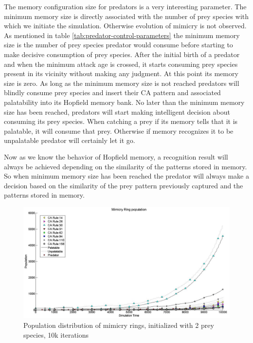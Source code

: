 The memory configuration size for predators is a very interesting parameter. The minimum memory size is directly associated with the number of prey species with which we initiate the simulation. Otherwise evolution of mimicry is not observed. As mentioned in table \ref{tab:predator-control-parameters} the minimum memory size is the number of prey species predator would consume before starting to make decisive consumption of prey species. After the initial birth of a predator and when the minimum attack age is crossed, it starts consuming prey species present in its vicinity without making any judgment. At this point its memory size is zero. As long as the minimum memory size is not reached predators will blindly consume prey species and insert their CA pattern and associated palatability into its Hopfield memory bank. No later than the minimum memory size has been reached, predators will start making intelligent decision about consuming its prey species. When catching a prey if its memory tells that it is palatable, it will consume that prey. Otherwise if memory recognizes it to be unpalatable predator will certainly let it go.

Now as we know the behavior of Hopfield memory, a recognition result will always be achieved depending on the similarity of the patterns stored in memory. So when minimum memory size has been reached the predator will always make a decision based on the similarity of the prey pattern previously captured and the patterns stored in memory.

\begin{figure}[H]
	\centering
	\includegraphics[scale=0.40]{images/simTime10k-2Prey}
	\caption[Population distribution of mimicry rings (2 prey species, 10k iterations)]{Population distribution of mimicry rings, initialized with 2 prey species, 10k iterations}
	\label{fig:plot-2-prey}
\end{figure}

